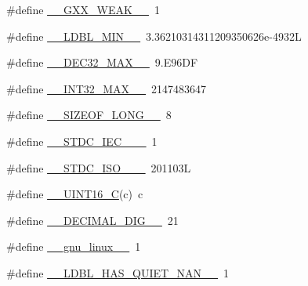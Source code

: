 \begin{DoxyCompactItemize}
\item 
\#define \hyperlink{build-analizer__host-_desktop___qt__5__9__0___g_c_c__64bit-_release_2moc__predefs_8h_afb5a2a4891df4551832357e97c6c3c59}{\+\_\+\+\_\+\+G\+X\+X\+\_\+\+W\+E\+A\+K\+\_\+\+\_\+}~1
\item 
\#define \hyperlink{build-analizer__host-_desktop___qt__5__9__0___g_c_c__64bit-_release_2moc__predefs_8h_ab572f59c4b0c5a1f4c2953f38a76d7b3}{\+\_\+\+\_\+\+L\+D\+B\+L\+\_\+\+M\+I\+N\+\_\+\+\_\+}~3.\+36210314311209350626e-\/4932\+L
\item 
\#define \hyperlink{build-analizer__host-_desktop___qt__5__9__0___g_c_c__64bit-_release_2moc__predefs_8h_ad3165a97a460b88ccdea80967918f250}{\+\_\+\+\_\+\+D\+E\+C32\+\_\+\+M\+A\+X\+\_\+\+\_\+}~9.\+E96\+D\+F
\item 
\#define \hyperlink{build-analizer__host-_desktop___qt__5__9__0___g_c_c__64bit-_release_2moc__predefs_8h_abf681096fa9e21512a3fe83f0dcfdb36}{\+\_\+\+\_\+\+I\+N\+T32\+\_\+\+M\+A\+X\+\_\+\+\_\+}~2147483647
\item 
\#define \hyperlink{build-analizer__host-_desktop___qt__5__9__0___g_c_c__64bit-_release_2moc__predefs_8h_aaa8084a56e3732008acafea8fd15eb2f}{\+\_\+\+\_\+\+S\+I\+Z\+E\+O\+F\+\_\+\+L\+O\+N\+G\+\_\+\+\_\+}~8
\item 
\#define \hyperlink{build-analizer__host-_desktop___qt__5__9__0___g_c_c__64bit-_release_2moc__predefs_8h_ab7d84ba8d87b8bb40aa752334bb51b23}{\+\_\+\+\_\+\+S\+T\+D\+C\+\_\+\+I\+E\+C\+\_\+\_\+\+\_\+}~1
\item 
\#define \hyperlink{build-analizer__host-_desktop___qt__5__9__0___g_c_c__64bit-_release_2moc__predefs_8h_acb6063ed9d8841cf71c93f2bf34832e0}{\+\_\+\+\_\+\+S\+T\+D\+C\+\_\+\+I\+S\+O\+\_\+\_\+\+\_\+}~201103\+L
\item 
\#define \hyperlink{build-analizer__host-_desktop___qt__5__9__0___g_c_c__64bit-_release_2moc__predefs_8h_aa860a111dcff819d3502dda14f8ac778}{\+\_\+\+\_\+\+U\+I\+N\+T16\+\_\+\+C}(c)~c
\item 
\#define \hyperlink{build-analizer__host-_desktop___qt__5__9__0___g_c_c__64bit-_release_2moc__predefs_8h_aeb56455e98000942147dfd63ec1c2fa6}{\+\_\+\+\_\+\+D\+E\+C\+I\+M\+A\+L\+\_\+\+D\+I\+G\+\_\+\+\_\+}~21
\item 
\#define \hyperlink{build-analizer__host-_desktop___qt__5__9__0___g_c_c__64bit-_release_2moc__predefs_8h_a51b087854dc3c2f76946efb432745639}{\+\_\+\+\_\+gnu\+\_\+linux\+\_\+\+\_\+}~1
\item 
\#define \hyperlink{build-analizer__host-_desktop___qt__5__9__0___g_c_c__64bit-_release_2moc__predefs_8h_a10a15ae17c3b791fe9b9721965ebfee4}{\+\_\+\+\_\+\+L\+D\+B\+L\+\_\+\+H\+A\+S\+\_\+\+Q\+U\+I\+E\+T\+\_\+\+N\+A\+N\+\_\+\+\_\+}~1

\end{DoxyCompactItemize}
